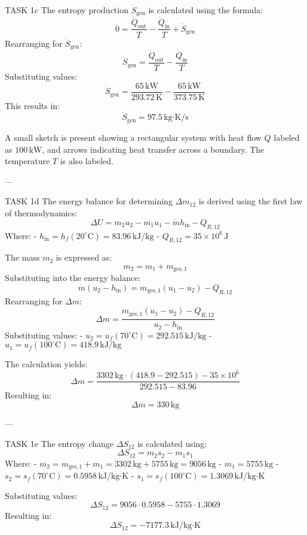 TASK 1c  
The entropy production \( \dot{S}_{\text{gen}} \) is calculated using the formula:  
\[
0 = \frac{\dot{Q}_{\text{out}}}{T} - \frac{\dot{Q}_{\text{in}}}{T} + \dot{S}_{\text{gen}}
\]  
Rearranging for \( \dot{S}_{\text{gen}} \):  
\[
\dot{S}_{\text{gen}} = \frac{\dot{Q}_{\text{out}}}{T} - \frac{\dot{Q}_{\text{in}}}{T}
\]  
Substituting values:  
\[
\dot{S}_{\text{gen}} = \frac{65 \, \text{kW}}{293.72 \, \text{K}} - \frac{65 \, \text{kW}}{373.75 \, \text{K}}
\]  
This results in:  
\[
\dot{S}_{\text{gen}} = 97.5 \, \text{kg·K/s}
\]  

A small sketch is present showing a rectangular system with heat flow \( Q \) labeled as \( 100 \, \text{kW} \), and arrows indicating heat transfer across a boundary. The temperature \( T \) is also labeled.

---

TASK 1d  
The energy balance for determining \( \Delta m_{12} \) is derived using the first law of thermodynamics:  
\[
\Delta U = m_2 u_2 - m_1 u_1 - \dot{m} h_{\text{in}} - Q_{R,12}
\]  
Where:  
- \( h_{\text{in}} = h_f(20^\circ\text{C}) = 83.96 \, \text{kJ/kg} \)  
- \( Q_{R,12} = 35 \times 10^6 \, \text{J} \)  

The mass \( m_2 \) is expressed as:  
\[
m_2 = m_1 + m_{\text{ges},1}
\]  
Substituting into the energy balance:  
\[
\dot{m} (u_2 - h_{\text{in}}) = m_{\text{ges},1} (u_1 - u_2) - Q_{R,12}
\]  
Rearranging for \( \Delta m \):  
\[
\Delta m = \frac{m_{\text{ges},1} (u_1 - u_2) - Q_{R,12}}{u_2 - h_{\text{in}}}
\]  
Substituting values:  
- \( u_2 = u_f(70^\circ\text{C}) = 292.515 \, \text{kJ/kg} \)  
- \( u_1 = u_f(100^\circ\text{C}) = 418.9 \, \text{kJ/kg} \)  

The calculation yields:  
\[
\Delta m = \frac{3302 \, \text{kg} \cdot (418.9 - 292.515) - 35 \times 10^6}{292.515 - 83.96}
\]  
Resulting in:  
\[
\Delta m = 330 \, \text{kg}
\]  

---

TASK 1e  
The entropy change \( \Delta S_{12} \) is calculated using:  
\[
\Delta S_{12} = m_2 s_2 - m_1 s_1
\]  
Where:  
- \( m_2 = m_{\text{ges},1} + m_1 = 3302 \, \text{kg} + 5755 \, \text{kg} = 9056 \, \text{kg} \)  
- \( m_1 = 5755 \, \text{kg} \)  
- \( s_2 = s_f(70^\circ\text{C}) = 0.5958 \, \text{kJ/kg·K} \)  
- \( s_1 = s_f(100^\circ\text{C}) = 1.3069 \, \text{kJ/kg·K} \)  

Substituting values:  
\[
\Delta S_{12} = 9056 \cdot 0.5958 - 5755 \cdot 1.3069
\]  
Resulting in:  
\[
\Delta S_{12} = -7177.3 \, \text{kJ/kg·K}
\]  